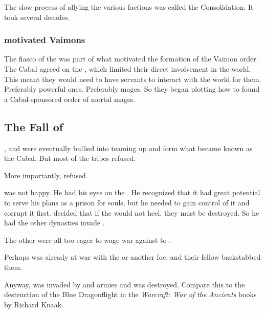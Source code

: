 The slow process of allying the various \resphan{} factions was called the Consolidation. 
It took several decades.





\subsubsection{\Cuezca motivated Vaimons}
The fiasco of the \CuezcanApocalypse{} was part of what motivated the formation of the Vaimon order. 
The Cabal agreed on the , which limited their direct involvement in the world. 
This meant they would need to have servants to interact with the world for them. 
Preferably powerful ones. 
Preferably mages. 
So they began plotting how to found a Cabal-sponsored order of mortal mages. 









\subsection{The Fall of \Kezerad}
\TiphredSerah, \CiriathSepher{} and \Mystraacht{} were eventually bullied into teaming up and form what became known as the Cabal. 
But most of the \Baelzerach{} tribes refused. 

More importantly, \Kezerad{} refused. 

\Daggerrain{} was not happy. 
He had his eyes on the \Kezeradi{} \dweomer. 
He recognized that it had great potential to serve his plans as a prison for \human{} souls, but he needed to gain control of it and corrupt it first. 
\Daggerrain{} decided that if the \Kezeradi{} would not heel, they must be destroyed. 
So he had the other dynasties invade \Kezerad. 

The other \resphain{} were all too eager to wage war against \Kezerad{} to . 

Perhaps \Kezerad{} was already at war with the \Baelzerach{} or another foe, and their fellow \resphain{} backstabbed them.

Anyway, \Kezerad{} was invaded by \resphan{} and \bane{} armies and was destroyed. 
Compare this to the destruction of the Blue Dragonflight in the \emph{Warcraft: War of the Ancients} books by Richard Knaak. 

